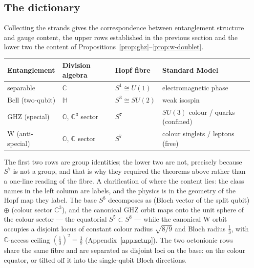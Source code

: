 \subsection{The dictionary}

Collecting the strands gives the correspondence between entanglement structure and gauge content,
the upper rows established in the previous section and the lower two the content of
Propositions~\ref{prop:ghz}--\ref{prop:w-doublet}.

\begin{center}
\begin{tabular}{llll}
\hline
Entanglement & Division algebra & Hopf fibre & Standard Model \\
\hline
separable & $\mathbb{C}$ & $S^1 \cong U(1)$ & electromagnetic phase \\
Bell (two-qubit) & $\mathbb{H}$ & $S^3 \cong SU(2)$ & weak isospin \\
GHZ (special) & $\mathbb{O}$, $\mathbb{C}^3$ sector & $S^7$ & $SU(3)$ colour / quarks (confined) \\
W (anti-special) & $\mathbb{O}$, $\mathbb{C}$ sector & $S^7$ & colour singlets / leptons (free) \\
\hline
\end{tabular}
\end{center}

The first two rows are group identities; the lower two are not, precisely because $S^7$ is not a
group, and that is why they required the theorems above rather than a one-line reading of the fibre.
A clarification of where the content lies: the class names in the left column are labels, and the
physics is in the geometry of the Hopf map they label. The base $S^8$ decomposes as (Bloch vector of
the split qubit) $\oplus$ (colour sector $\mathbb{C}^3$), and the canonical GHZ orbit maps onto the
unit sphere of the colour sector --- the equatorial $S^5\subset S^8$ --- while the canonical W orbit
occupies a disjoint locus of constant colour radius $\sqrt{8/9}$ and Bloch radius $\tfrac13$, with
$\mathbb{C}$-access ceiling $(\tfrac13)^2 = \tfrac19$ (Appendix~\ref{app:setup}). The two octonionic
rows share the same fibre and are separated as disjoint loci on the base: on the colour equator, or
tilted off it into the single-qubit Bloch directions.

